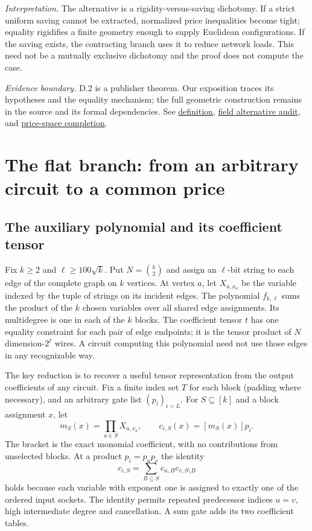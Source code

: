 \documentclass[11pt,letterpaper]{article}
\theoremstyle{definition}\newtheorem{definition}[theorem]{Definition}\newtheorem{example}[theorem]{Example}
\theoremstyle{remark}\newtheorem{remark}[theorem]{Remark}
\newcommand{\pub}[3]{\href{https://github.com/anthropics/formal-math/blob/11b6c7e3c927df2658f513b6b68ea7f8929c62c5/vp-vnp/#1\#L#2}{#3}}
\newcommand{\aud}[2]{\href{https://github.com/nousentllc/VP-VNP-Review/blob/567303d0bcf4f9d54390437b137752446e58ccd6/#1}{#2}}
\newcommand{\scope}[1]{\par\smallskip\noindent\textit{Evidence boundary.} #1\par\smallskip}
\newcommand{\interpret}[1]{\par\smallskip\noindent\textit{Interpretation.} #1\par\smallskip}
\begin{document}
\interpret{The alternative is a rigidity-versus-saving dichotomy. If a strict uniform saving cannot be extracted, normalized price inequalities become tight; equality rigidifies a finite geometry enough to supply Euclidean configurations. If the saving exists, the contracting branch uses it to reduce network loads. This need not be a mutually exclusive dichotomy and the proof does not compute the case.}
\scope{D.2 is a publisher theorem. Our exposition traces its hypotheses and the equality mechanism; the full geometric construction remains in the source and its formal dependencies. See \pub{Paper/Alternative.lean}{43}{definition}, \aud{passes/07-field-alternative.md}{field alternative audit}, and \aud{passes/08-price-space-completion.md}{price-space completion}.}

\section{The flat branch: from an arbitrary circuit to a common price}\label{sec:flat}
\subsection{The auxiliary polynomial and its coefficient tensor}
Fix $k\ge2$ and $\ell\ge100\sqrt{k}$. Put $N=\binom{k}{2}$ and assign an $\ell$-bit string to each edge of the complete graph on $k$ vertices. At vertex $a$, let $X_{a,x_a}$ be the variable indexed by the tuple of strings on its incident edges. The polynomial $f_{k,\ell}$ sums the product of the $k$ chosen variables over all shared edge assignments. Its multidegree is one in each of the $k$ blocks. The coefficient tensor $t$ has one equality constraint for each pair of edge endpoints; it is the tensor product of $N$ dimension-$2^\ell$ wires. A circuit computing this polynomial need not use those edges in any recognizable way.

The key reduction is to recover a useful tensor representation from the output coefficients of any circuit. Fix a finite index set $T$ for each block (padding where necessary), and an arbitrary gate list $(p_i)_{i<L}$. For $S\subseteq[k]$ and a block assignment $x$, let
\[
 m_S(x)=\prod_{a\in S}X_{a,x_a},\qquad c_{i,S}(x)=[m_S(x)]p_i.
\]
The bracket is the exact monomial coefficient, with no contributions from unselected blocks. At a product $p_i=p_u p_v$ the identity
\begin{equation}\label{eq:split}
 c_{i,S}=\sum_{B\subseteq S}c_{u,B}c_{v,S\setminus B}
\end{equation}
holds because each variable with exponent one is assigned to exactly one of the ordered input sockets. The identity permits repeated predecessor indices $u=v$, high intermediate degree and cancellation. A sum gate adds its two coefficient tables.
\end{document}
